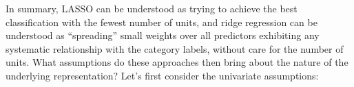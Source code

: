 
In summary, LASSO can be understood as trying to achieve the best classification with the fewest number of units, and ridge regression can be understood as ``spreading'' small weights over all predictors exhibiting any systematic relationship with the category labels, without care for the number of units. What assumptions do these approaches then bring about the nature of the underlying representation? Let's first consider the univariate assumptions: 

